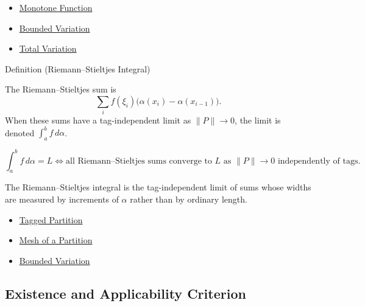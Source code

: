 \begin{dependencies}
\begin{itemize}
  \item \hyperref[def:function-monotone]{Monotone Function}
  \item \hyperref[def:bounded-variation-integration]{Bounded Variation}
  \item \hyperref[def:total-variation]{Total Variation}
\end{itemize}
\end{dependencies}

\begin{definitionbox}{Definition (Riemann--Stieltjes Integral)}
\begin{definition}
\label{def:riemann-stieltjes-integral}
The Riemann--Stieltjes sum is
\[
  \sum_i f(\xi_i)\bigl(\alpha(x_i)-\alpha(x_{i-1})\bigr).
\]
When these sums have a tag-independent limit as \(\|P\|\to0\), the limit is
denoted \(\int_a^b f\,d\alpha\).
\end{definition}
\end{definitionbox}

\begin{remark*}
\[
\int_a^b f\,d\alpha=L
\Longleftrightarrow
\text{all Riemann--Stieltjes sums converge to }L\text{ as }\|P\|\to0
\text{ independently of tags}.
\]
\end{remark*}

\begin{remark*}[Interpretation]
The Riemann--Stieltjes integral is the tag-independent limit of sums whose
widths are measured by increments of \(\alpha\) rather than by ordinary length.
\end{remark*}

\begin{dependencies}
\begin{itemize}
  \item \hyperref[def:tagged-partition-integration]{Tagged Partition}
  \item \hyperref[def:partition-mesh]{Mesh of a Partition}
  \item \hyperref[def:bounded-variation-integration]{Bounded Variation}
\end{itemize}
\end{dependencies}

\subsection*{Existence and Applicability Criterion}

